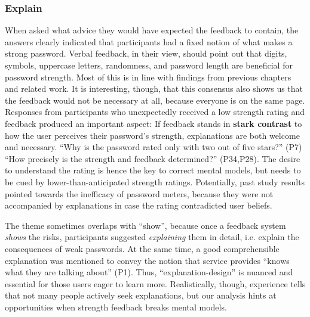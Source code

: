 \subsubsection{Explain}
When asked what advice they would have expected the feedback to contain, the answers clearly indicated that participants had a fixed notion of what makes a strong password. Verbal feedback, in their view, should point out that digits, symbols, uppercase letters, randomness, and password length are beneficial for password strength. Most of this is in line with findings from previous chapters and related work. It is interesting, though, that this consensus also shows us that the feedback would not be necessary at all, because everyone is on the same page. Responses from participants who unexpectedly received a low strength rating and feedback produced an important aspect: If feedback stands in \textbf{stark contrast} to how the user perceives their password's strength, explanations are both welcome and necessary. ``Why is the password rated only with two out of five stars?'' (P7) ``How precisely is the strength and feedback determined?'' (P34,P28). The desire to understand the rating is hence the key to correct mental models, but needs to be cued by lower-than-anticipated strength ratings. Potentially, past study results pointed towards the inefficacy of password meters, because they were not accompanied by explanations in case the rating contradicted user beliefs. 

The theme sometimes overlaps with ``show'', because once a feedback system \textit{shows} the risks, participants suggested \textit{explaining} them in detail, i.e. explain the consequences of weak passwords. At the same time, a good comprehensible explanation was mentioned to convey the notion that service provides ``knows what they are talking about'' (P1). Thus, ``explanation-design'' is nuanced and essential for those users eager to learn more. Realistically, though, experience tells that not many people actively seek explanations, but our analysis hints at opportunities when strength feedback breaks mental models.


